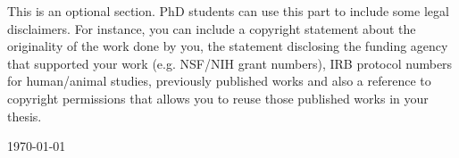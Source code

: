 This is an optional section. PhD students can use this part to include some legal disclaimers. For instance, you can include a copyright statement about the originality of the work done by you, the statement disclosing the funding agency that supported your work (e.g. NSF/NIH grant numbers), IRB protocol numbers for human/animal studies, previously published works and also a reference to copyright permissions that allows you to reuse those published works in your thesis.

\vspace{1cm}
\begin{singlespace}
	\hfill \@author
	
	\hfill \today
\end{singlespace}